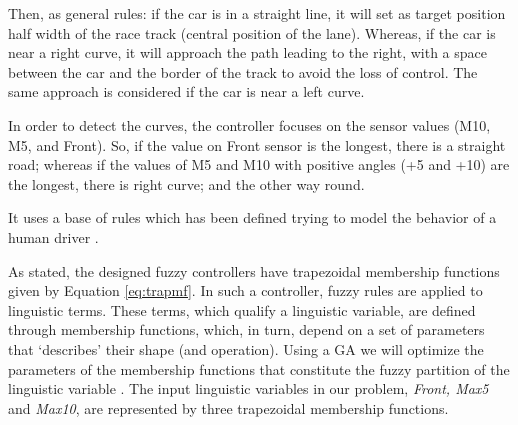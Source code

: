 \documentclass[10pt,journal,compsoc]{IEEEtran}
\begin{document}
Then, as general rules: if the car is in a straight line, it will set as target position half width of the race track (central position of the lane). Whereas, if the car is near a right curve, it will approach the path leading to the right, with a space between the car and the border of the track to avoid the loss of control. The same approach is considered if the car is near a left curve.

In order to detect the curves, the controller focuses on the sensor values (M10, M5, and Front). So, if the value on Front sensor is the longest, there is a straight road; whereas if the values of M5 and M10 with positive angles (+5 and +10) are the longest, there is right curve; and the other way round.

It uses a base of rules which has been defined trying to model the behavior of a human driver \cite{salem_evo17}.






As stated, the designed fuzzy controllers have trapezoidal membership functions given by Equation \ref{eq:trapmf}.
In such a controller, fuzzy rules are applied to linguistic
terms. These terms, which qualify a linguistic variable, are defined
through membership functions, which, in turn, depend on a set of
parameters that `describes' their shape (and operation). Using a GA we
will optimize the parameters of the membership functions that
constitute the fuzzy partition of the linguistic variable
\cite{ThangG08}. The input linguistic variables in our problem,
\textit{Front, Max5} and \textit{Max10}, are represented by three
trapezoidal membership functions. 
\end{document}
